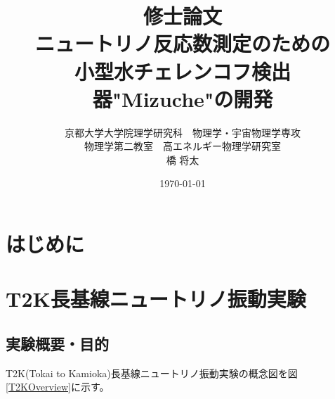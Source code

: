 \documentclass[11pt]{jreport}
\newcommand{\figref}[1]{図\ref{#1}}
\begin{document}
\begin{titlepage}

\title{修士論文\\ニュートリノ反応数測定のための\\小型水チェレンコフ検出器"Mizuche"の開発}
\author{京都大学大学院理学研究科　物理学・宇宙物理学専攻\\
物理学第二教室　高エネルギー物理学研究室\\
橋 将太}
\date{\today}


\end{titlepage}

\maketitle

\begin{abstract}
\end{abstract}

\tableofcontents



\chapter{はじめに}
\pagestyle{bothstyle}


\chapter{T2K長基線ニュートリノ振動実験}


\section{実験概要・目的}
T2K(Tokai to Kamioka)長基線ニュートリノ振動実験の概念図を\figref{T2KOverview}に示す。
\end{document}
